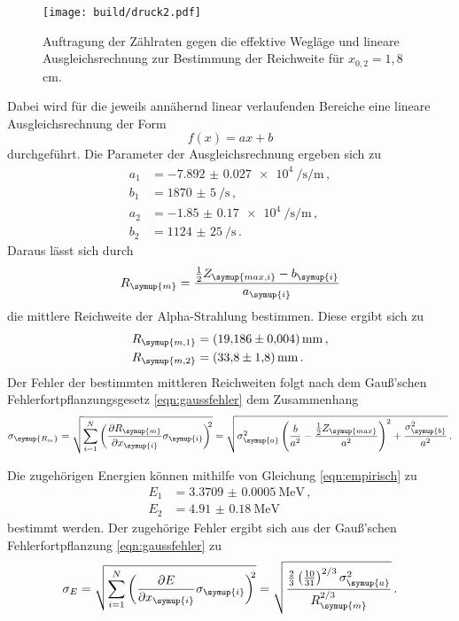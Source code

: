 \begin{figure}[H]
  \centering
  \texttt{[image: build/druck2.pdf]}
  \caption{Auftragung der Zählraten gegen die effektive Wegläge und lineare Ausgleichsrechnung
  zur Bestimmung der Reichweite für $x_{0,2}=1{,}8\,$cm.}
  \label{fig:druck2}
\end{figure}

Dabei wird für die jeweils annähernd linear verlaufenden Bereiche eine lineare Ausgleichsrechnung
der Form
\begin{equation}
  f(x)=ax+b
\end{equation}
durchgeführt. Die Parameter der Ausgleichsrechnung ergeben sich zu
\begin{align*}
  a_1 &= \SI{-7.892(0027)e4}{\per\second\per\meter}\,, \\
  b_1 &= \SI{1870(5)}{\per\second}\,,  \\
  a_2 &= \SI{-1.85(017)e4}{\per\second\per\meter} \,,  \\
  b_2 &= \SI{1124(25)}{\per\second} \,.
\end{align*}
Daraus lässt sich durch
\begin{equation}
  R_{\symup{m}}=\frac{\frac{1}{2}Z_{\symup{max,i}}-b_{\symup{i}}}{a_{\symup{i}}}
\end{equation}
die mittlere Reichweite der Alpha-Strahlung bestimmen. Diese ergibt sich zu
\begin{align*}
  R_{\symup{m,1}}&=\SI{19.186(0004)}{\milli\meter} \,, \\
  R_{\symup{m,2}}&=\SI{33.8(18)}{\milli\meter} \,.
\end{align*}
Der Fehler der bestimmten mittleren Reichweiten folgt nach dem Gauß'schen Fehlerfortpflanzungsgesetz
\eqref{eqn:gaussfehler} dem Zusammenhang
\begin{equation}
  \sigma_{\symup{R_m}} = \sqrt{\sum\limits_{i = 1}^N\left(\frac{\partial R_{\symup{m}}}{\partial x_{\symup{i}}}
  \sigma_{\symup{i}} \right)^{\!\! 2}} = \sqrt{\sigma_{\symup{a}}^{2} \left(\frac{b}{a^{2}} -
  \frac{\frac{1}{2}Z_{\symup{max}}}{a^{2}}\right)^{2} + \frac{\sigma_{\symup{b}}^{2}}{a^{2}} } \,.
\end{equation}

Die zugehörigen Energien können mithilfe von Gleichung \eqref{eqn:empirisch} zu
\begin{align*}
  E_1&=\SI{3.3709(00005)}{\MeV} \,,\\
  E_2&=\SI{4.91(018)}{\MeV}
\end{align*}
bestimmt werden. Der zugehörige Fehler ergibt sich aus der Gauß'schen Fehlerfortpflanzung
\eqref{eqn:gaussfehler} zu
\begin{equation}
  \sigma_{E} = \sqrt{\sum\limits_{i = 1}^N\left( \frac{\partial E}{\partial x_{\symup{i}}}
   \sigma_{\symup{i}} \right)^{\!\! 2}} =
   \sqrt{\frac{\frac{2}{3}\left(\frac{10}{31}\right)^{2/3}\sigma_{\symup{a}}^{2}}{R_{\symup{m}}^{2/3}}}\,.
\end{equation}

